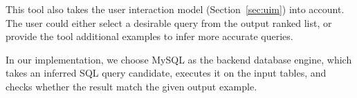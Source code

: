 This tool also takes the user interaction model (Section~\ref{sec:uim}) into account.
The user could either select a desirable query from the output ranked list, or provide
the tool additional examples to infer more accurate queries.

In our implementation, we choose MySQL as the backend database engine, which takes an
inferred SQL query candidate, executes it on the input tables, and checks whether the
result match the given output example.

